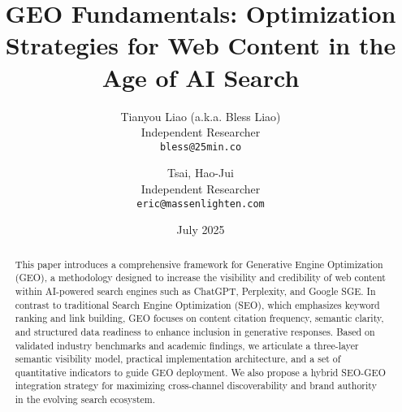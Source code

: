 \documentclass[11pt]{article}
\title{GEO Fundamentals: Optimization Strategies for Web Content in the Age of AI Search}
\author{
  Tianyou Liao (a.k.a. Bless Liao) \\
  Independent Researcher \\
  \texttt{bless@25min.co}
  \and
  Tsai, Hao-Jui \\
  Independent Researcher \\
  \texttt{eric@massenlighten.com}
}
\date{July 2025}
\begin{document}
\maketitle

\begin{abstract}
This paper introduces a comprehensive framework for Generative Engine Optimization (GEO), a methodology designed to increase the visibility and credibility of web content within AI-powered search engines such as ChatGPT, Perplexity, and Google SGE. In contrast to traditional Search Engine Optimization (SEO), which emphasizes keyword ranking and link building, GEO focuses on content citation frequency, semantic clarity, and structured data readiness to enhance inclusion in generative responses. Based on validated industry benchmarks and academic findings, we articulate a three-layer semantic visibility model, practical implementation architecture, and a set of quantitative indicators to guide GEO deployment. We also propose a hybrid SEO-GEO integration strategy for maximizing cross-channel discoverability and brand authority in the evolving search ecosystem.
\end{abstract}













\end{document}
